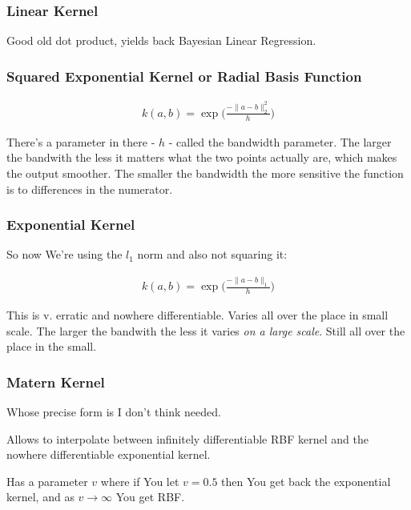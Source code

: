 \documentclass{article}
\begin{document}
		\subsubsection{Linear Kernel}
		
			Good old dot product, yields back Bayesian Linear Regression.
		
		\subsubsection{Squared Exponential Kernel or Radial Basis Function}
		
			\begin{align}
				k(a, b) = \exp\bigg(\frac{-\|a-b\|^2_2}{h}  \bigg)
			\end{align}
			
			There's a parameter in there - $h$ - called the bandwidth parameter. The larger the bandwith the less it matters what the two points actually are, which makes the output smoother. The smaller the bandwidth the more sensitive the function is to differences in the numerator.
		
		\subsubsection{Exponential Kernel}
		
			So now We're using the $l_1$ norm and also not squaring it:
		
			\begin{align}
				k(a, b) = \exp\bigg(\frac{-\|a-b\|_1}{h}  \bigg)
			\end{align}
			
			This is v. erratic and nowhere differentiable. Varies all over the place in small scale. The larger the bandwith the less it varies \textit{on a large scale}. Still all over the place in the small.
			
		\subsubsection{Matern Kernel}
		
			Whose precise form is I don't think needed.
			
			Allows to interpolate between infinitely differentiable RBF kernel and the nowhere differentiable exponential kernel.
			
			Has a parameter $v$ where if You let $v=0.5$ then You get back the exponential kernel, and as $v\to\infty$ You get RBF.
			
\end{document}
